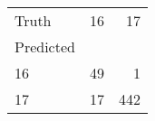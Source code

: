 \begin{tabular}{lrr}
\toprule
Truth & 16 & 17 \\
Predicted &  &  \\
\midrule
16 & 49 & 1 \\
17 & 17 & 442 \\
\bottomrule
\end{tabular}
